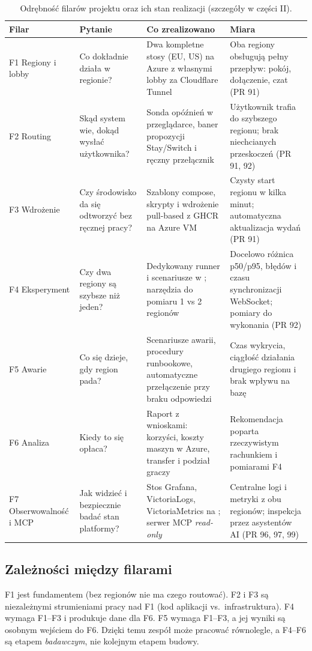 \begin{table}[H]
\centering\footnotesize
\renewcommand{\arraystretch}{1.3}
\begin{tabularx}{\textwidth}{@{}l>{\raggedright\arraybackslash}p{}Y>{\raggedright\arraybackslash}p{0.2\textwidth}@{}}
\toprule
\textbf{Filar} & \textbf{Pytanie} & \textbf{Co zrealizowano} & \textbf{Miara} \\
\midrule
F1 Regiony i lobby & Co dokładnie działa w regionie? & Dwa kompletne stosy (EU, US) na Azure z własnymi lobby za Cloudflare Tunnel & Oba regiony obsługują pełny przepływ: pokój, dołączenie, czat (PR 91) \\
F2 Routing & Skąd system wie, dokąd wysłać użytkownika? & Sonda opóźnień w przeglądarce, baner propozycji Stay/Switch i ręczny przełącznik & Użytkownik trafia do szybszego regionu; brak niechcianych przeskoczeń (PR 91, 92) \\
F3 Wdrożenie & Czy środowisko da się odtworzyć bez ręcznej pracy? & Szablony compose, skrypty  i wdrożenie pull-based z GHCR na Azure VM & Czysty start regionu w kilka minut; automatyczna aktualizacja wydań (PR 91) \\
F4 Eksperyment & Czy dwa regiony są szybsze niż jeden? & Dedykowany runner i scenariusze w ; narzędzia do pomiaru 1 vs 2 regionów & Docelowo różnica p50/p95, błędów i czasu synchronizacji WebSocket; pomiary do wykonania (PR 92) \\
F5 Awarie & Co się dzieje, gdy region pada? & Scenariusze awarii, procedury runbookowe, automatyczne przełączenie przy braku odpowiedzi & Czas wykrycia, ciągłość działania drugiego regionu i brak wpływu na bazę \\
F6 Analiza & Kiedy to się opłaca? & Raport z wnioskami: korzyści, koszty maszyn w Azure, transfer i podział graczy & Rekomendacja poparta rzeczywistym rachunkiem i pomiarami F4 \\
F7 Obserwowalność i MCP & Jak widzieć i bezpiecznie badać stan platformy? & Stos Grafana, VictoriaLogs, VictoriaMetrics na ; serwer MCP \emph{read-only} & Centralne logi i metryki z obu regionów; inspekcja przez asystentów AI (PR 96, 97, 99) \\
\bottomrule
\end{tabularx}
\caption{Odrębność filarów projektu oraz ich stan realizacji (szczegóły w części II).}
\end{table}

\subsection{Zależności między filarami}
F1 jest fundamentem (bez regionów nie ma czego routować). F2 i F3 są niezależnymi
strumieniami pracy nad F1 (kod aplikacji vs.\ infrastruktura). F4 wymaga F1--F3 i
produkuje dane dla F6. F5 wymaga F1--F3, a jej wyniki są osobnym wejściem do F6.
Dzięki temu zespół może pracować równolegle, a F4--F6 są etapem \emph{badawczym},
nie kolejnym etapem budowy.

